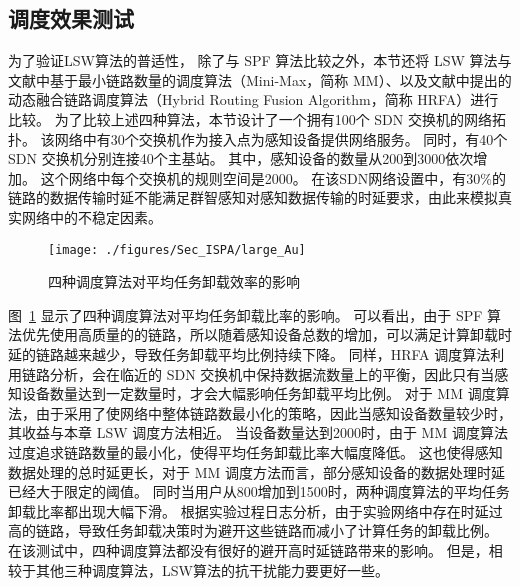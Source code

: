 \subsection{调度效果测试}

为了验证LSW算法的普适性，
除了与 SPF 算法比较之外，本节还将 LSW 算法与文献中基于最小链路数量的调度算法（Mini-Max，简称 MM）、以及文献中提出的动态融合链路调度算法（Hybrid Routing Fusion Algorithm，简称 HRFA）进行比较。
为了比较上述四种算法，本节设计了一个拥有100个 SDN 交换机的网络拓扑。
该网络中有30个交换机作为接入点为感知设备提供网络服务。
同时，有40个 SDN 交换机分别连接40个主基站。
其中，感知设备的数量从200到3000依次增加。
这个网络中每个交换机的规则空间是2000。
在该SDN网络设置中，有30\%的链路的数据传输时延不能满足群智感知对感知数据传输的时延要求，由此来模拟真实网络中的不稳定因素。

\begin{figure}[!b]
  \centering
  \texttt{[image: ./figures/Sec\_ISPA/large\_Au]}
  \vspace{-0.5em}
  \caption{四种调度算法对平均任务卸载效率的影响}
  \vspace{-1em}
  \label{fig_largeAu}
\end{figure}

图~\ref{fig_largeAu} 显示了四种调度算法对平均任务卸载比率的影响。
可以看出，由于 SPF 算法优先使用高质量的的链路，所以随着感知设备总数的增加，可以满足计算卸载时延的链路越来越少，导致任务卸载平均比例持续下降。
同样，HRFA 调度算法利用链路分析，会在临近的 SDN 交换机中保持数据流数量上的平衡，因此只有当感知设备数量达到一定数量时，才会大幅影响任务卸载平均比例。
对于 MM 调度算法，由于采用了使网络中整体链路数最小化的策略，因此当感知设备数量较少时，其收益与本章 LSW 调度方法相近。
当设备数量达到2000时，由于 MM 调度算法过度追求链路数量的最小化，使得平均任务卸载比率大幅度降低。
这也使得感知数据处理的总时延更长，对于 MM 调度方法而言，部分感知设备的数据处理时延已经大于限定的阈值。
同时当用户从800增加到1500时，两种调度算法的平均任务卸载比率都出现大幅下滑。
根据实验过程日志分析，由于实验网络中存在时延过高的链路，导致任务卸载决策时为避开这些链路而减小了计算任务的卸载比例。
在该测试中，四种调度算法都没有很好的避开高时延链路带来的影响。
但是，相较于其他三种调度算法，LSW算法的抗干扰能力要更好一些。


